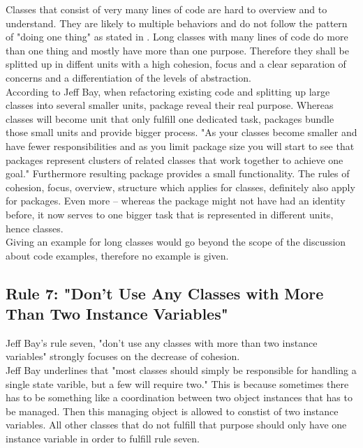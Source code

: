 Classes that consist of very many lines of code are hard to overview and to understand. They are likely to multiple behaviors and do not follow the pattern of "doing one thing" as stated in \cite{cc}. Long classes with many lines of code do more than one thing and mostly have more than one purpose. Therefore they shall be splitted up in diffent units with a high cohesion, focus and a clear separation of concerns and a differentiation of the levels of abstraction. 
\\

According to Jeff Bay, when refactoring existing code and splitting up large classes into several smaller units, package reveal their real purpose. Whereas classes will become unit that only fulfill one dedicated task, packages bundle those small units and provide bigger process. "As your classes become smaller and have fewer responsibilities and as you limit package size you will start to see that packages represent clusters of related classes that work together to achieve one goal." \cite{oc2008} Furthermore resulting package provides a small functionality. The rules of cohesion, focus, overview, structure which applies for classes, definitely also apply for packages. Even more -- whereas the package might not have had an identity before, it now serves to one bigger task that is represented in different units, hence classes. 
\\

Giving an example for long classes would go beyond the scope of the discussion about code examples, therefore no example is given.

\subsection*{Rule 7: "Don’t Use Any Classes with More Than Two Instance Variables"}
Jeff Bay's rule seven, "don't use any classes with more than two instance variables" strongly focuses on the decrease of cohesion.
\\

Jeff Bay underlines that "most classes should simply be responsible for handling a single state varible, but a few will require two." \cite{oc2008} This is because sometimes there has to be something like a coordination between two object instances that has to be managed. Then this managing object is allowed to constist of two instance variables. All other classes that do not fulfill that purpose should only have one instance variable in order to fulfill rule seven.
\\

